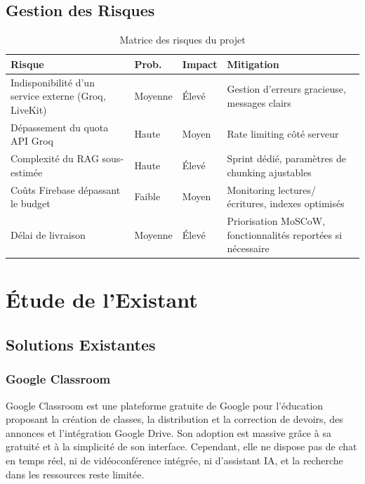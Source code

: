 \documentclass[12pt, a4paper, twoside]{report}
\begin{document}
\section{Gestion des Risques}

\begin{table}[H]
 
  \begin{tabularx}{\textwidth}{|X|l|l|p{5cm}|}
    \hline
    \textbf{Risque} & \textbf{Prob.} & \textbf{Impact} & \textbf{Mitigation} \\
    \hline
    Indisponibilité d'un service externe (Groq, LiveKit) & Moyenne & Élevé
      & Gestion d'erreurs gracieuse, messages clairs \\
    Dépassement du quota API Groq & Haute & Moyen
      & Rate limiting côté serveur \\
    Complexité du RAG sous-estimée & Haute & Élevé
      & Sprint dédié, paramètres de chunking ajustables \\
    Coûts Firebase dépassant le budget & Faible & Moyen
      & Monitoring lectures/écritures, indexes optimisés \\
    Délai de livraison & Moyenne & Élevé
      & Priorisation MoSCoW, fonctionnalités reportées si nécessaire \\
    \hline
  \end{tabularx}
   \caption{Matrice des risques du projet}
  \label{tab:risks}
\end{table}

\chapter{Étude de l'Existant}

\section{Solutions Existantes}

\subsection{Google Classroom}

Google Classroom est une plateforme gratuite de Google pour l'éducation proposant
la création de classes, la distribution et la correction de devoirs, des annonces
et l'intégration Google Drive. Son adoption est massive grâce à sa gratuité et à
la simplicité de son interface. Cependant, elle ne dispose pas de chat en temps
réel, ni de vidéoconférence intégrée, ni d'assistant IA, et la recherche dans les
ressources reste limitée.
\end{document}
